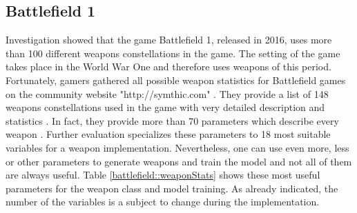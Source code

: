 \documentclass[MGS,Master,english]{twbook}%
\begin{document}
\subsection{Battlefield 1}
Investigation showed that the game Battlefield 1, released in 2016, uses more than 100 different weapons constellations in the game. The setting of the game takes place in the World War One and therefore uses weapons of this period. Fortunately, gamers gathered all possible weapon statistics for Battlefield games on the community website "http://symthic.com" \cite{symthic::bf1stats}. They provide a list of 148 weapons constellations used in the game with very detailed description and statistics \cite{symthic::bf1stats}. In fact, they provide more than 70 parameters which describe every weapon \cite{symthic::bf1stats}. Further evaluation specializes these parameters to 18 most suitable variables for a weapon implementation. Nevertheless, one can use even more, less or other parameters to generate weapons and train the model and not all of them are always useful. Table \ref{battlefield::weaponStats} shows these most useful parameters for the weapon class and model training. As already indicated, the number of the variables is a subject to change during the implementation.
\end{document}
